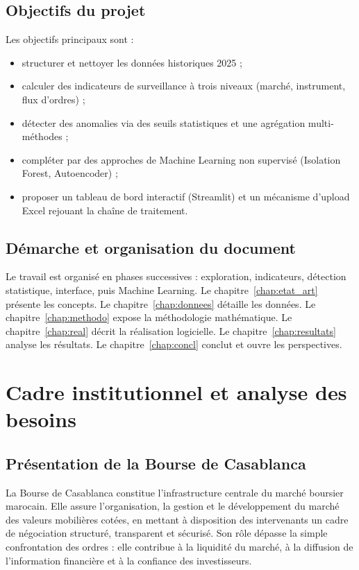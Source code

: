 \documentclass[a4paper,12pt,twoside,openright]{report}
\begin{document}
\section{Objectifs du projet}
Les objectifs principaux sont :
\begin{itemize}
  \item structurer et nettoyer les données historiques 2025 ;
  \item calculer des indicateurs de surveillance à trois niveaux (marché, instrument, flux d'ordres) ;
  \item détecter des anomalies via des seuils statistiques et une agrégation multi-méthodes ;
  \item compléter par des approches de Machine Learning non supervisé (Isolation Forest, Autoencoder) ;
  \item proposer un tableau de bord interactif (Streamlit) et un mécanisme d'upload Excel rejouant la chaîne de traitement.
\end{itemize}

\section{Démarche et organisation du document}
Le travail est organisé en phases successives : exploration, indicateurs, détection statistique, interface, puis Machine Learning. Le chapitre~\ref{chap:etat_art} présente les concepts. Le chapitre~\ref{chap:donnees} détaille les données. Le chapitre~\ref{chap:methodo} expose la méthodologie mathématique. Le chapitre~\ref{chap:real} décrit la réalisation logicielle. Le chapitre~\ref{chap:resultats} analyse les résultats. Le chapitre~\ref{chap:concl} conclut et ouvre les perspectives.

\chapter{Cadre institutionnel et analyse des besoins}
\label{chap:cadre}

\section{Présentation de la Bourse de Casablanca}
La Bourse de Casablanca constitue l'infrastructure centrale du marché boursier marocain. Elle assure l'organisation, la gestion et le développement du marché des valeurs mobilières cotées, en mettant à disposition des intervenants un cadre de négociation structuré, transparent et sécurisé. Son rôle dépasse la simple confrontation des ordres : elle contribue à la liquidité du marché, à la diffusion de l'information financière et à la confiance des investisseurs.
\end{document}
